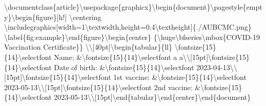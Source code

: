 \documentclass{article}%
\begin{document}
%
\normalsize%
\textbackslash{}documentclass\{article\}\textbackslash{}usepackage\{graphicx\}\textbackslash{}begin\{document\}\textbackslash{}pagestyle\{empty\}\textbackslash{}begin\{figure\}{[}h!{]}  \textbackslash{}centering  \textbackslash{}includegraphics{[}width=1\textbackslash{}textwidth,height=0.4\textbackslash{}textheight{]}\{./AUBCMC.png\}  \textbackslash{}label\{fig:example\}\textbackslash{}end\{figure\}\textbackslash{}begin\{center\}  \{\textbackslash{}huge\textbackslash{}bfseries\textbackslash{}mbox\{COVID{-}19 Vaccination Certificate\}\} \textbackslash{}\textbackslash{}{[}40pt{]}\textbackslash{}begin\{tabular\}\{ll\}    \textbackslash{}fontsize\{15\}\{14\}\textbackslash{}selectfont Name: \&\textbackslash{}fontsize\{15\}\{14\}\textbackslash{}selectfont a a\textbackslash{}\textbackslash{}{[}15pt{]}\textbackslash{}fontsize\{15\}\{14\}\textbackslash{}selectfont Date of birth: \&\textbackslash{}fontsize\{15\}\{14\}\textbackslash{}selectfont 2023{-}04{-}13\textbackslash{}\textbackslash{}{[}15pt{]}\textbackslash{}fontsize\{15\}\{14\}\textbackslash{}selectfont 1st vaccine: \&\textbackslash{}fontsize\{15\}\{14\}\textbackslash{}selectfont 2023{-}05{-}13\textbackslash{}\textbackslash{}{[}15pt{]}\textbackslash{}fontsize\{15\}\{14\}\textbackslash{}selectfont 2nd vaccine: \&\textbackslash{}fontsize\{15\}\{14\}\textbackslash{}selectfont 2023{-}05{-}13\textbackslash{}\textbackslash{}{[}15pt{]}\textbackslash{}end\{tabular\}\textbackslash{}end\{center\}\textbackslash{}end\{document\}%
\end{document}
